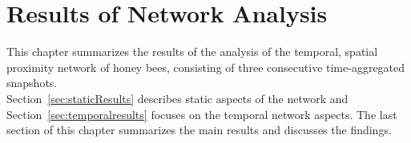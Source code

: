 \chapter{Results of Network Analysis}
\label{ch:results}
This chapter summarizes the results of the analysis of the temporal, spatial proximity network of honey bees, consisting of three consecutive time-aggregated snapshots.\\
Section~\ref{sec:staticResults} describes static aspects of the network and Section~\ref{sec:temporalresults} focuses on the temporal network aspects.
The last section of this chapter summarizes the main results and discusses the findings.


\newpage

